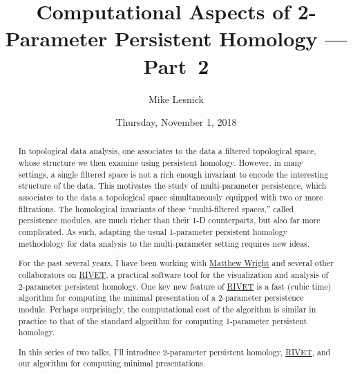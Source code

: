 \documentclass{UAmathtalk}
\author{Mike Lesnick}
\title{Computational Aspects of 2-Parameter Persistent Homology --- Part~2}
\date{Thursday, November 1, 2018}
\begin{document}
\maketitle

\begin{abstract}
In topological data analysis, one associates to the data a filtered topological space, whose structure we then examine using persistent homology. However, in many settings, a single filtered space is not a rich enough invariant to encode the interesting structure of the data. This motivates the study of multi-parameter persistence, which associates to the data a topological space simultaneously equipped with two or more filtrations. The homological invariants of these ``multi-filtered spaces,'' called persistence modules, are much richer than their 1-D counterparts, but also far more complicated. As such, adapting the usual 1-parameter persistent homology methodology for data analysis to the multi-parameter setting requires new ideas.

For the past several years, I have been working with \href{http://www.mlwright.org}{Matthew Wright} and several other collaborators on \href{http://rivet.online}{RIVET}, a practical software tool for the visualization and analysis of 2-parameter persistent homology. One key new feature of \href{http://rivet.online}{RIVET} is a fast (cubic time) algorithm for computing the minimal presentation of a 2-parameter persistence module. Perhaps surprisingly, the computational cost of the algorithm is similar in practice to that of the standard algorithm for computing 1-parameter persistent homology.

In this series of two talks, I'll introduce 2-parameter persistent homology, \href{http://rivet.online}{RIVET}, and our algorithm for computing minimal presentations.
\end{abstract}
\end{document}
